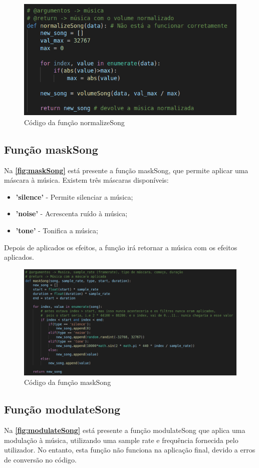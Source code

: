 \documentclass{report}
\begin{document}
\begin{figure}[!h]
\center 
\includegraphics[width=330pt]{img/normalizeSong.png}
\caption{Código da função normalizeSong}
\label{fig:normalizeSong}
\end{figure}

\subsection{Função maskSong}
\label{ssec:maskSong}
Na \textbf{\autoref{fig:maskSong}} está presente a função maskSong, que permite aplicar uma máscara à música. Existem três
máscaras disponíveis:
\begin{itemize}
    \item \textbf{'silence'} - Permite silenciar a música;
    \item \textbf{'noise'} - Acrescenta ruído à música;
    \item \textbf{'tone'} - Tonifica a música;
\end{itemize}
Depois de aplicados os efeitos, a função irá retornar a música com os efeitos aplicados.

\begin{figure}[!h]
\center 
\includegraphics[width=330pt]{img/maskSong.png}
\caption{Código da função maskSong}
\label{fig:maskSong}
\end{figure}

\subsection{Função modulateSong}
\label{ssec:modulateSong}
Na \textbf{\autoref{fig:modulateSong}} está presente a função modulateSong que aplica uma modulação à música, utilizando 
uma sample rate e frequência fornecida pelo utilizador. No entanto, esta função não funciona na aplicação final, 
devido a erros de conversão no código.
\end{document}
